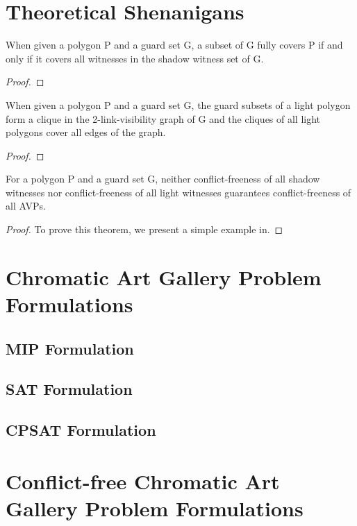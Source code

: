 \chapter{Theoretical Shenanigans}

\begin{theorem}
When given a polygon P and a guard set G, a subset of G fully covers P if and only if it covers all witnesses in the shadow witness set of G.
\end{theorem}
\begin{proof}
    
\end{proof}

\begin{theorem}
When given a polygon P and a guard set G, the guard subsets of a light polygon form a clique in the 2-link-visibility graph of G and the cliques of all light polygons cover all edges of the graph.
\end{theorem}
\begin{proof}
    
\end{proof}

\begin{theorem}
For a polygon P and a guard set G, neither conflict-freeness of all shadow witnesses nor conflict-freeness of all light witnesses guarantees conflict-freeness of all AVPs.
\end{theorem}
\begin{proof}
To prove this theorem, we present a simple example in.
\end{proof}

\chapter{Chromatic Art Gallery Problem Formulations}

\section{MIP Formulation}

\section{SAT Formulation}

\section{CPSAT Formulation}

\chapter{Conflict-free Chromatic Art Gallery Problem Formulations}

